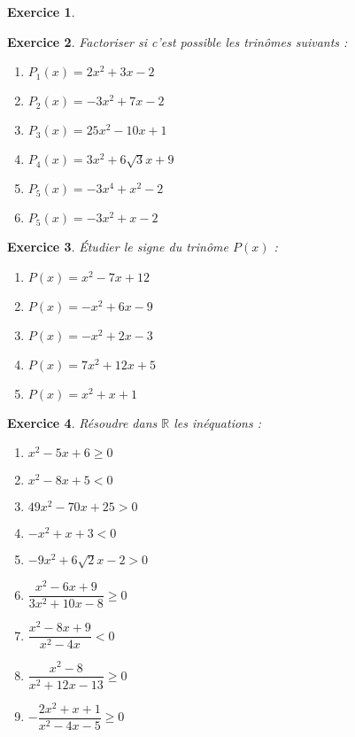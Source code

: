 \documentclass[12pt,a4paper]{article}
\theoremstyle{mystyle}
\newtheorem{exo}{Exercice}
\begin{document}
\begin{multicols*}{2}
\begin{exo}
\end{exo}

\begin{exo}
Factoriser si c'est possible les trinômes suivants :
\begin{enumerate}
	\item \(P_{1}(x) = 2x^{2} + 3x - 2\)
	\item \(P_{2}(x) = -3x^{2} + 7x - 2\)
	\item \(P_{3}(x) = 25x^{2} - 10x + 1\)
	\item \(P_{4}(x) = 3x^{2} + 6\sqrt{3}x + 9\)
	\item \(P_{5}(x) = -3x^{4} + x^{2} - 2\)
	\item \(P_{5}(x) = -3x^{2} + x - 2\)
\end{enumerate}
\end{exo}

\newcolumn

\begin{exo}
Étudier le signe du trinôme \(P(x)\) :
\begin{enumerate}
    \item \(P(x) = x^{2} - 7x + 12\)
    \item \(P(x) = -x^{2} + 6x - 9\)
    \item \(P(x) = -x^{2} + 2x - 3\)
    \item \(P(x) = 7x^{2} + 12x + 5\)
    \item \(P(x) = x^{2} + x + 1\)
\end{enumerate}
\end{exo}

\begin{exo}
Résoudre dans \(\mathbb{R}\) les inéquations :
\begin{enumerate}
	\item \(x^{2} - 5x + 6 \geq 0\)
	\item \(x^{2} - 8x + 5 < 0\)
	\item \(49x^{2} - 70x + 25 > 0\)
	\item \(-x^{2} + x + 3 < 0\)
	\item \(-9x^{2} + 6\sqrt{2}x - 2 > 0\)
	\item \(\dfrac{x^{2} - 6x + 9}{3x^{2} + 10x - 8} \geq 0\)
	\item \(\dfrac{x^{2} - 8x + 9}{x^{2} - 4x} < 0\)
	\item \(\dfrac{x^{2} - 8}{x^{2} + 12x - 13} \geq 0\)
	\item \(-\dfrac{2x^{2} + x + 1}{x^{2} - 4x - 5} \geq 0\)
\end{enumerate}
\end{exo}


\end{multicols*}
\end{document}

